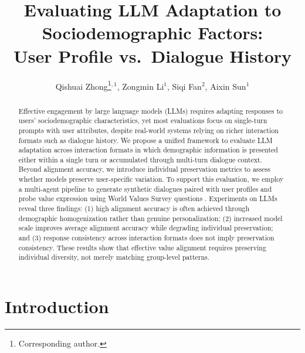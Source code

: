 \documentclass[final]{clv2025}
\begin{document}
\title{Evaluating LLM Adaptation to Sociodemographic Factors:\\
User Profile vs.\ Dialogue History}

\author{Qishuai Zhong\thanks{Corresponding author.}$^{,1}$,
        Zongmin Li$^{1}$,
        Siqi Fan$^{2}$,
        Aixin Sun$^{1}$}


\maketitle

\begin{abstract}
Effective engagement by large language models (LLMs) requires adapting responses to users' sociodemographic characteristics, yet most evaluations focus on single-turn prompts with user attributes, despite real-world systems relying on richer interaction formats such as dialogue history. We propose a unified framework to evaluate LLM adaptation across interaction formats in which demographic information is presented either within a single turn or accumulated through multi-turn dialogue context. Beyond alignment accuracy, we introduce individual preservation metrics to assess whether models preserve user-specific variation. To support this evaluation, we employ a multi-agent pipeline to generate synthetic dialogues paired with user profiles and probe value expression using World Values Survey questions \citep{Haerpfer2020-qe}. Experiments on LLMs reveal three findings: (1) high alignment accuracy is often achieved through demographic homogenization rather than genuine personalization; (2) increased model scale improves average alignment accuracy while degrading individual preservation; and (3) response consistency across interaction formats does not imply preservation consistency. These results show that effective value alignment requires preserving individual diversity, not merely matching group-level patterns.
\end{abstract}

\setcounter{secnumdepth}{4}

\section{Introduction}
\label{sec:introduction}
\end{document}
